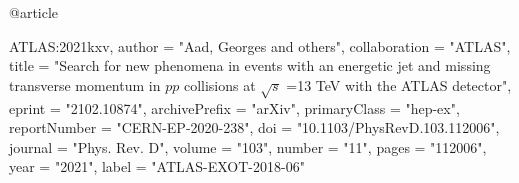 @article{ATLAS:2021kxv,
    author = "Aad, Georges and others",
    collaboration = "ATLAS",
    title = "{Search for new phenomena in events with an energetic jet and missing transverse momentum in $pp$ collisions at $\sqrt {s}$ =13  TeV with the ATLAS detector}",
    eprint = "2102.10874",
    archivePrefix = "arXiv",
    primaryClass = "hep-ex",
    reportNumber = "CERN-EP-2020-238",
    doi = "10.1103/PhysRevD.103.112006",
    journal = "Phys. Rev. D",
    volume = "103",
    number = "11",
    pages = "112006",
    year = "2021",
    label = "ATLAS-EXOT-2018-06"

}

